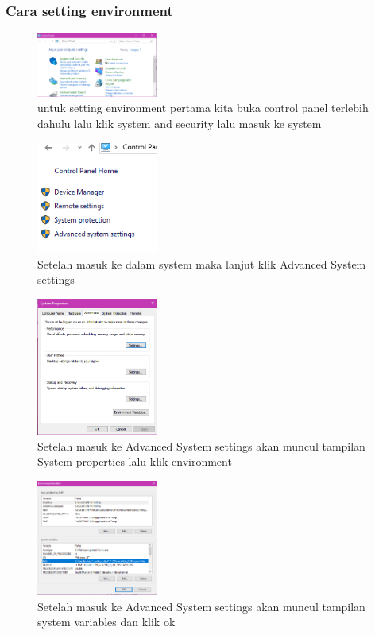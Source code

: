 \subsubsection{Cara setting environment}
	\begin{figure}[H]
		\includegraphics[width=4cm]{figures/1184065/SystemPIP.PNG}
		\centering
		\caption{untuk setting environment pertama kita buka control panel terlebih dahulu lalu klik system and security lalu masuk ke system}
	\end{figure}
	\begin{figure}[H]
		\includegraphics[width=4cm]{figures/1184065/PIPAdvanced}
		\centering
		\caption{Setelah masuk ke dalam system maka lanjut klik Advanced System settings}
	\end{figure}
	\begin{figure}[H]
		\includegraphics[width=4cm]{figures/1184065/EnvironmentVar.PNG}
		\centering
		\caption{Setelah masuk ke Advanced System settings akan muncul tampilan System properties lalu klik environment}
	\end{figure}
	\begin{figure}[H]
		\includegraphics[width=4cm]{figures/1184065/EnvironmentPIP.PNG}
		\centering
		\caption{Setelah masuk ke Advanced System settings akan muncul tampilan system variables dan klik ok}
	\end{figure}
